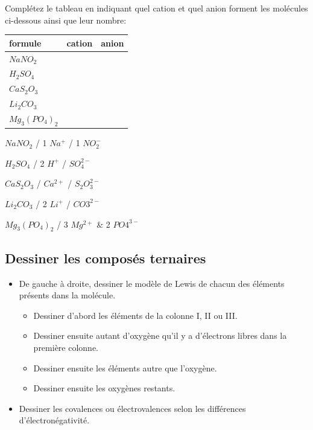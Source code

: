 \documentclass[
  11pt,
  a4paper,
  openany]{book}
\providecommand{\tightlist}{%
  \setlength{\itemsep}{0pt}\setlength{\parskip}{0pt}}
\begin{document}
\begin{Exercise}
Complétez le tableau en indiquant quel cation et quel anion forment les molécules ci-dessous ainsi que leur nombre:

\end{Exercise}

\begin{longtable}[]{@{}lcc@{}}
\toprule()
formule & cation & anion \\
\midrule()
\endhead
\(NaNO_2\) & & \\
\(H_2SO_4\) & & \\
\(CaS_2O_3\) & & \\
\(Li_2CO_3\) & & \\
\(Mg_3(PO_4)_2\) & & \\
\bottomrule()
\end{longtable}

\begin{Answer}
\(NaNO_2\) / 1 \(Na^+\) / 1 \(NO_2^-\)

\(H_2SO_4\) / 2 \(H^+\) / \(SO_4^{2-}\)

\(CaS_2O_3\) / \(Ca^{2+}\) / \(S_2O_3^{2-}\)

\(Li_2CO_3\) / 2 \(Li^+\) / \(CO3^{2-}\)

\(Mg_3(PO_4)_2\) / 3 \(Mg^{2+}\) \& 2 \(PO4^{3-}\)

\end{Answer}

\hypertarget{dessiner-les-composuxe9s-ternaires}{%
\subsection{Dessiner les composés ternaires}\label{dessiner-les-composuxe9s-ternaires}}

\begin{itemize}
\tightlist
\item
  De gauche à droite, dessiner le modèle de Lewis de chacun des éléments présents dans la molécule.

  \begin{itemize}
  \tightlist
  \item
    Dessiner d'abord les éléments de la colonne I, II ou III.
  \item
    Dessiner ensuite autant d'oxygène qu'il y a d'électrons libres dans la première colonne.
  \item
    Dessiner ensuite les éléments autre que l'oxygène.
  \item
    Dessiner ensuite les oxygènes restants.
  \end{itemize}
\item
  Dessiner les covalences ou électrovalences selon les différences d'électronégativité.
\end{itemize}
\end{document}
